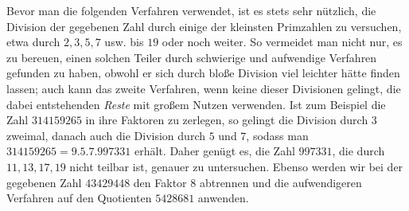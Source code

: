 Bevor man die folgenden Verfahren verwendet, ist es stets sehr nützlich, die Division der gegebenen Zahl durch einige der kleinsten Primzahlen zu versuchen, etwa durch \(2,\allowbreak 3,\allowbreak 5,\allowbreak 7\) usw. bis \(19\) oder noch weiter. So vermeidet man nicht nur, es zu bereuen, einen solchen Teiler durch schwierige und aufwendige Verfahren gefunden zu haben, obwohl er sich durch bloße Division viel leichter hätte finden lassen; auch kann das zweite Verfahren, wenn keine dieser Divisionen gelingt, die dabei entstehenden \textit{Reste} mit großem Nutzen verwenden. Ist zum Beispiel die Zahl \(314159265\) in ihre Faktoren zu zerlegen, so gelingt die Division durch \(3\) zweimal, danach auch die Division durch \(5\) und \(7\), sodass man \(314159265=9.5.7.997331\) erhält. Daher genügt es, die Zahl \(997331\), die durch \(11,\allowbreak 13,\allowbreak 17,\allowbreak 19\) nicht teilbar ist, genauer zu untersuchen. Ebenso werden wir bei der gegebenen Zahl \(43429448\) den Faktor \(8\) abtrennen und die aufwendigeren Verfahren auf den Quotienten \(5428681\) anwenden.

